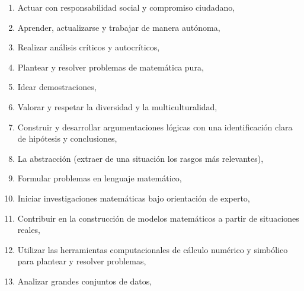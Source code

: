 \documentclass[a4paper, 12pt]{article}
\begin{document}
\begin{enumerate}

\item { Actuar con responsabilidad social y compromiso
ciudadano,} 



\item {Aprender, actualizarse y trabajar de manera autónoma,} 
 


\item {Realizar análisis  críticos y autocríticos,} 
 
\item {Plantear y resolver problemas de matemática pura,} 

\item{Idear demostraciones,}

\item {Valorar y respetar  la diversidad
y la multiculturalidad,} 
 




 

\item {Construir y desarrollar
argumentaciones lógicas con una
identificación clara de hipótesis y conclusiones,} 
 
\item {La abstracción (extraer de una situación los rasgos más relevantes),} 
 


\item {Formular problemas
en lenguaje matemático,} 
 

  


\item {Iniciar investigaciones
matemáticas bajo orientación de experto,} 
 


 
 


\item {Contribuir en la
construcción de modelos matemáticos a
partir de situaciones reales,} 
 


\item {Utilizar las herramientas
computacionales de cálculo numérico
y simbólico para plantear y resolver
problemas,} 
 


\item {Analizar  grandes conjuntos de datos,} 
 



\end{enumerate}
\end{document}
